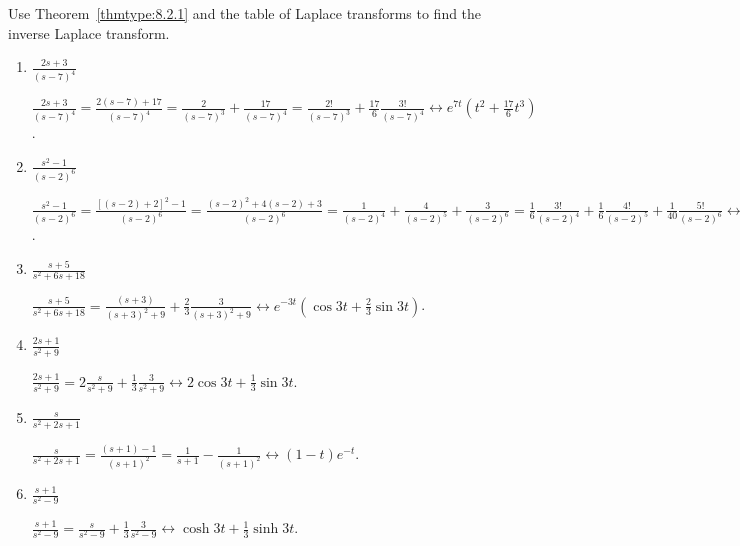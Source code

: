 \documentclass{ximera}
\begin{document}
\begin{problem}\label{exer:8.2.2}
 Use Theorem~\ref{thmtype:8.2.1} and the table of Laplace transforms
  to find the inverse Laplace transform.

\begin{enumerate}
    \item $\frac{2s+3}{(s-7)^4}$

\begin{solution}
$\frac{2s+3}{(s-7)^4}=\frac{2(s-7)+17}{(s-7)^4}=
\frac{2}{(s-7)^3}+\frac{17}{(s-7)^4}
=\frac{2!}{(s-7)^3}+\frac{17}{6}\frac{3!}{(s-7)^4}
\leftrightarrow e^{7t}\left(t^2+\frac{17}{6}t^3\right)$.
\end{solution}

    \item $\frac{s^2-1}{(s-2)^6}$

\begin{solution}
$\frac{s^2-1}{(s-2)^6}=\frac{[(s-2)+2]^2-1}{(s-2)^6}
=\frac{(s-2)^2+4(s-2)+3}{(s-2)^6}
=\frac{1}{(s-2)^4}+\frac{4}{(s-2)^5}+\frac{3}{(s-2)^6}
=\frac{1}{6}\frac{3!}{(s-2)^4}+\frac{1}{6}\frac{4!}{(s-2)^5}
+\frac{1}{40} \frac{5!}{(s-2)^6}\leftrightarrow\left(\frac{1}{6}t^3+\frac{1}{6}t^4+\frac{1}{40}t^5\right)e^{2t}$.
\end{solution}
    
    \item $\frac{s+5}{s^2+6s+18}$

\begin{solution}
$\frac{s+5}{s^2+6s+18}=\frac{(s+3)}{(s+3)^2+9}
+\frac{2}{3}\frac{3}{(s+3)^2+9}
\leftrightarrow e^{-3t}\left(\cos 3t+\frac{2}{3}\sin 3t\right)$.
\end{solution}
    
    \item $\frac{2s+1}{s^2+9}$

\begin{solution}
$\frac{2s+1}{s^2+9}=2\frac{s}{s^2+9}+\frac{1}{3}\frac{3}{s^2+9}\leftrightarrow
2\cos 3t+\frac{1}{3}\sin 3t$.
\end{solution}

    \item $\frac{s}{s^2+2s+1}$
\begin{solution}
$\frac{s}{s^2+2s+1}=\frac{(s+1)-1}{(s+1)^2}=
\frac{1}{s+1}-\frac{1}{(s+1)^2}\leftrightarrow
(1-t)e{^{-t}}$. 
\end{solution}

    \item $\frac{s+1}{s^2-9}$

\begin{solution}
$\frac{s+1}{s^2-9}=\frac{s}{s^2-9}+\frac{1}{3}\frac{3}{s^2-9}\leftrightarrow {\cosh 3t+\frac{1}{3}\sinh 3t}$.   
\end{solution}



\end{enumerate}
\end{problem}
\end{document}

